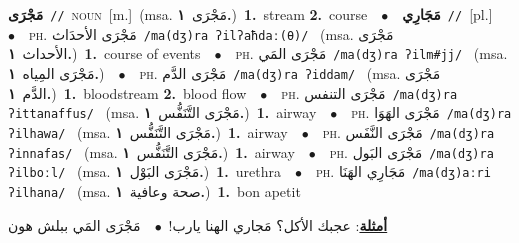 \documentclass[10pt,a4paper,twoside]{article} %
\begin{document}
\begin{multicols}{2}
{\setlength\topsep{0pt}\textbf{\foreignlanguage{arabic}{مَجْرَى}}\ {\color{gray}\texttt{//}\color{black}}\ \textsc{noun}\ [m.]\ \color{gray}(msa. \foreignlanguage{arabic}{مَجْرَى}~\foreignlanguage{arabic}{\textbf{١.}})\color{black}\ \textbf{1.}~stream  \textbf{2.}~course\ \ $\bullet$\ \ \setlength\topsep{0pt}\textbf{\foreignlanguage{arabic}{مَجَارِي}}\ {\color{gray}\texttt{//}\color{black}}\ [pl.]\ \ $\bullet$\ \ \textsc{ph.} \color{gray} \foreignlanguage{arabic}{مَجْرَى الأحدَاث}\color{black}\ {\color{gray}\texttt{/{\sffamily ma(dʒ)ra ʔilʔaħdaː(θ)}/}\color{black}}\ \color{gray} (msa. \foreignlanguage{arabic}{مَجْرَى الأحداث}~\foreignlanguage{arabic}{\textbf{١.}})\color{black}\ \textbf{1.}~course of events\ \ $\bullet$\ \ \textsc{ph.} \color{gray} \foreignlanguage{arabic}{مَجْرَى المَي}\color{black}\ {\color{gray}\texttt{/{\sffamily ma(dʒ)ra ʔilm\#jj}/}\color{black}}\ \color{gray} (msa. \foreignlanguage{arabic}{مَجْرَى المِياه}~\foreignlanguage{arabic}{\textbf{١.}})\color{black}\ \ $\bullet$\ \ \textsc{ph.} \color{gray} \foreignlanguage{arabic}{مَجْرَى الدَّم}\color{black}\ {\color{gray}\texttt{/{\sffamily ma(dʒ)ra ʔiddam}/}\color{black}}\ \color{gray} (msa. \foreignlanguage{arabic}{مَجْرَى الدَّم}~\foreignlanguage{arabic}{\textbf{١.}})\color{black}\ \textbf{1.}~bloodstream  \textbf{2.}~blood flow\ \ $\bullet$\ \ \textsc{ph.} \color{gray} \foreignlanguage{arabic}{مَجْرَى التنفس}\color{black}\ {\color{gray}\texttt{/{\sffamily ma(dʒ)ra ʔittanaffus}/}\color{black}}\ \color{gray} (msa. \foreignlanguage{arabic}{مَجْرَى التَّنَفُّس}~\foreignlanguage{arabic}{\textbf{١.}})\color{black}\ \textbf{1.}~airway\ \ $\bullet$\ \ \textsc{ph.} \color{gray} \foreignlanguage{arabic}{مَجْرَى الهَوَا}\color{black}\ {\color{gray}\texttt{/{\sffamily ma(dʒ)ra ʔilhawa}/}\color{black}}\ \color{gray} (msa. \foreignlanguage{arabic}{مَجْرَى التَّنَفُّس}~\foreignlanguage{arabic}{\textbf{١.}})\color{black}\ \textbf{1.}~airway\ \ $\bullet$\ \ \textsc{ph.} \color{gray} \foreignlanguage{arabic}{مَجْرَى النَّفَس}\color{black}\ {\color{gray}\texttt{/{\sffamily ma(dʒ)ra ʔinnafas}/}\color{black}}\ \color{gray} (msa. \foreignlanguage{arabic}{مَجْرَى التَّنَفُّس}~\foreignlanguage{arabic}{\textbf{١.}})\color{black}\ \textbf{1.}~airway\ \ $\bullet$\ \ \textsc{ph.} \color{gray} \foreignlanguage{arabic}{مَجْرَى البَول}\color{black}\ {\color{gray}\texttt{/{\sffamily ma(dʒ)ra ʔilboːl}/}\color{black}}\ \color{gray} (msa. \foreignlanguage{arabic}{مَجْرَى البَوْل}~\foreignlanguage{arabic}{\textbf{١.}})\color{black}\ \textbf{1.}~urethra\ \ $\bullet$\ \ \textsc{ph.} \color{gray} \foreignlanguage{arabic}{مَجَارِي الهَنَا}\color{black}\ {\color{gray}\texttt{/{\sffamily ma(dʒ)aːri ʔilhana}/}\color{black}}\ \color{gray} (msa. \foreignlanguage{arabic}{صحة وعافية}~\foreignlanguage{arabic}{\textbf{١.}})\color{black}\ \textbf{1.}~bon apetit\  \begin{flushright}\color{gray}\foreignlanguage{arabic}{\textbf{\underline{\foreignlanguage{arabic}{أمثلة}}}: عجبك الأكل؟ مَجاري الهنا يارب!\ $\bullet$\ \  مَجْرَى المَي ببلش هون}\end{flushright}\color{black}} \vspace{2mm}


\end{multicols}
\end{document}
